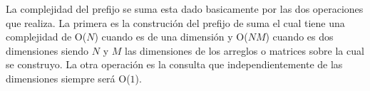 La complejidad del prefijo se suma esta dado basicamente por las dos operaciones que realiza. La primera es la construción del prefijo de suma el cual tiene una complejidad de O($N$) cuando es de una dimensión y O($NM$) cuando es dos dimensiones siendo $N$ y $M$ las dimensiones de los arreglos o matrices sobre la cual se construyo. La otra operación es la consulta que independientemente de las dimensiones siempre será O($1$). 